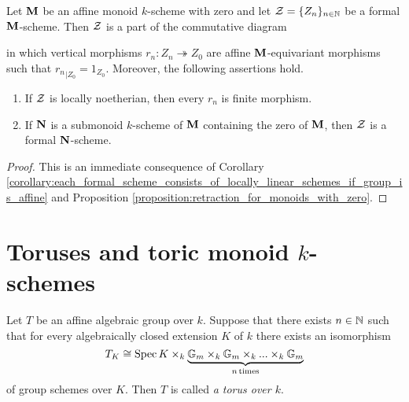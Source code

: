\begin{corollary}\label{corollary:restraction_for_formal_schemes_and_pointed_submonoids}
Let $\mathbf{M}$ be an affine monoid $k$-scheme with zero and let ${\mathcal Z} = \{Z_n\}_{n\in {\mathbb N}}$ be a formal $\mathbf{M}$-scheme. Then ${\mathcal Z}$ is a part of the commutative diagram
\begin{center}
\end{center}
in which vertical morphisms $r_n:Z_n\twoheadrightarrow Z_0$ are affine $\mathbf{M}$-equivariant morphisms such that ${r_n}_{\mid Z_0} = 1_{Z_0}$. Moreover, the following assertions hold.
\begin{enumerate}[label=\emph{\textbf{(\arabic*)}}, leftmargin=3.0em]
\item If ${\mathcal Z}$ is locally noetherian, then every $r_n$ is finite morphism.
\item If $\mathbf{N}$ is a submonoid $k$-scheme of $\mathbf{M}$ containing the zero of $\mathbf{M}$, then ${\mathcal Z}$ is a formal $\mathbf{N}$-scheme.
\end{enumerate}
\end{corollary}
\begin{proof}
This is an immediate consequence of Corollary \ref{corollary:each_formal_scheme_consists_of_locally_linear_schemes_if_group_is_affine} and Proposition \ref{proposition:retraction_for_monoids_with_zero}.
\end{proof}

\section{Toruses and toric monoid $k$-schemes}

\begin{definition}
Let $T$ be an affine algebraic group over $k$. Suppose that there exists $n\in {\mathbb N}$ such that for every algebraically closed extension $K$ of $k$ there exists an isomorphism
$$T_K \cong  \mathrm{Spec}\, K \times_k \underbrace{\mathbb{G}_{m}\times_k \mathbb{G}_{m}\times_k ...\times_k \mathbb{G}_{m}}_{n\,\mathrm{times}} $$
of group schemes over $K$. Then $T$ is called \textit{a torus over $k$}.
\end{definition}


